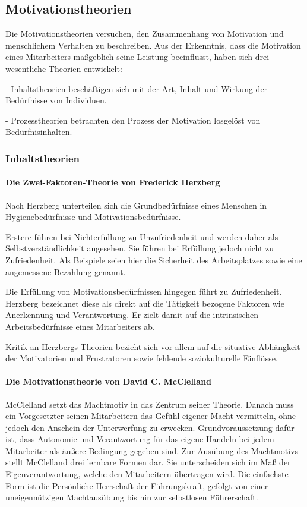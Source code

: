 \subsection{Motivationstheorien}
Die Motivationstheorien versuchen, den Zusammenhang von Motivation und menschlichem Verhalten zu beschreiben. Aus der Erkenntnis, dass die Motivation eines Mitarbeiters maßgeblich seine Leistung beeinflusst, haben sich drei wesentliche Theorien entwickelt:

- Inhaltstheorien beschäftigen sich mit \glqq der Art, Inhalt und Wirkung der Bedürfnisse von Individuen\grqq. \citep[S. 391]{Drumm.2008}

- Prozesstheorien betrachten den Prozess der Motivation losgelöst von Bedürfnisinhalten. \citep[S. 391]{Drumm.2008}

\subsubsection{Inhaltstheorien}
\paragraph{Die Zwei-Faktoren-Theorie von Frederick Herzberg}
Nach Herzberg unterteilen sich die Grundbedürfnisse eines Menschen in Hygienebedürfnisse und  Motivationsbedürfnisse.

Erstere führen bei Nichterfüllung zu Unzufriedenheit und werden daher als Selbstverständlichkeit angesehen. Sie führen bei Erfüllung jedoch nicht zu Zufriedenheit. Als Beispiele seien hier die Sicherheit des Arbeitsplatzes sowie eine angemessene Bezahlung genannt. \citep[S. 26]{Nowka.2013}

Die Erfüllung von Motivationsbedürfnissen hingegen führt zu Zufriedenheit. Herzberg bezeichnet diese als direkt auf die Tätigkeit bezogene Faktoren wie Anerkennung und Verantwortung. Er zielt damit auf die intrinsischen Arbeitsbedürfnisse eines Mitarbeiters ab. \citep[S. 26f]{Nowka.2013}

Kritik an Herzbergs Theorien bezieht sich vor allem auf die situative Abhängkeit der Motivatorien und Frustratoren sowie fehlende soziokulturelle Einflüsse. \citep[S. 396]{Drumm.2008}

\paragraph{Die Motivationstheorie von David C. McClelland}
McClelland setzt das Machtmotiv in das Zentrum seiner Theorie. Danach muss ein Vorgesetzter seinen Mitarbeitern das Gefühl eigener Macht vermitteln, ohne jedoch den Anschein der Unterwerfung zu erwecken. Grundvoraussetzung dafür ist, dass Autonomie und Verantwortung für das eigene Handeln bei jedem Mitarbeiter als äußere Bedingung gegeben sind. 
Zur Ausübung des Machtmotivs stellt McClelland drei lernbare Formen dar. Sie unterscheiden sich im Maß der Eigenverantwortung, welche den Mitarbeitern übertragen wird. Die einfachste Form ist die Persönliche Herrschaft der Führungskraft, gefolgt von einer uneigennützigen Machtausübung bis hin zur selbstlosen Führerschaft. \citep[S. 396ff]{Drumm.2008}

